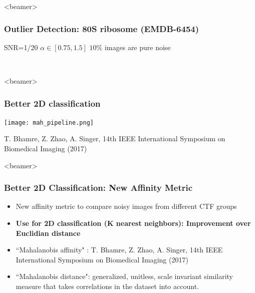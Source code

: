 \documentclass{beamer}
\begin{document}
\begin{frame}<beamer>
\frametitle{Outlier Detection: 80S ribosome (EMDB-6454)}
SNR=1/20 
$\alpha \in [0.75,1.5]$
$10\%$ images are pure noise
\begin{figure}[]
\centering
{}
\quad
{} \\
\quad
{}
\end{figure}
\end{frame}

\begin{frame}<beamer>
\frametitle{Better 2D classification}
\begin{center}
\texttt{[image: mah\_pipeline.png]}
\end{center}
{\tiny T. Bhamre, Z. Zhao, A. Singer, 14th IEEE International Symposium on Biomedical Imaging (2017)}
\end{frame}


\begin{frame}<beamer>
\frametitle{Better 2D Classification: New Affinity Metric}
\begin{itemize}
\item New affinity metric to compare noisy images from different CTF groups
\item \textbf{Use for 2D classification (K nearest neighbors): Improvement over Euclidian distance}
\item ``Mahalanobis affinity" : T. Bhamre, Z. Zhao, A. Singer, 14th IEEE International Symposium on Biomedical Imaging (2017)
\item ``Mahalanobis distance": generalized, unitless, scale invariant similarity measure that takes correlations in the dataset into account.

\end{itemize}
\end{frame}
\end{document}
